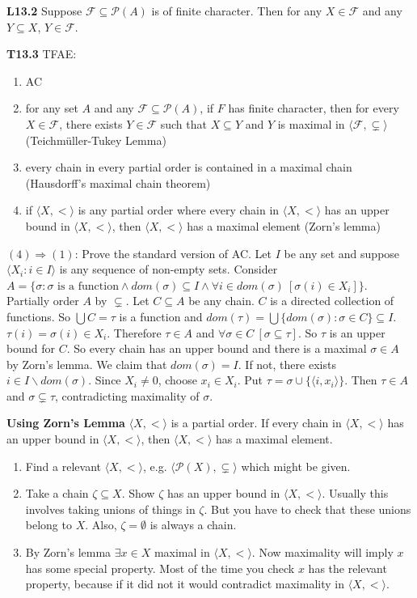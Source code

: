 \documentclass[10pt, landscape]{article}
\begin{document}
\begin{multicols*}{3}
\textbf{L13.2} Suppose $\mathcal{F}\subseteq\mathcal{P}(A)$ is of finite character. Then for any $X\in\mathcal{F}$ and any $Y\subseteq X$, $Y\in\mathcal{F}$.

\textbf{T13.3} TFAE:
\begin{enumerate}
    \item AC
    \item for any set $A$ and any $\mathcal{F}\subseteq\mathcal{P}(A)$, if $F$ has finite character, then for every $X \in \mathcal{F}$, there exists $Y\in\mathcal{F}$ such that $X\subseteq Y$ and $Y$ is maximal in $\langle\mathcal{F},\subsetneq\rangle$ (Teichmüller-Tukey Lemma)
    \item every chain in every partial order is contained in a maximal chain (Hausdorff's maximal chain theorem)
    \item if $\langle X, < \rangle$ is any partial order where every chain in $\langle X, < \rangle$ has an upper bound in $\langle X, <\rangle$, then $\langle X, <\rangle$ has a maximal element (Zorn's lemma)
\end{enumerate}
$(4) \Longrightarrow (1)$: Prove the standard version of AC. Let $I$ be any set and suppose $\langle X_i:i \in I\rangle$ is any sequence of non-empty sets. Consider $A=\{\sigma:\sigma \text{ is a function}\land dom(\sigma)\subseteq I \land \forall i \in dom(\sigma)\ [\sigma(i)\in X_i]\}$. Partially order $A$ by $\subsetneq$. Let $C\subseteq  A$ be any chain. $C$ is a directed collection of functions. So $\bigcup C=\tau$ is a function and $dom(\tau)=\bigcup\{dom(\sigma):\sigma\in C\}\subseteq I$. $\tau(i)=\sigma(i)\in X_i$. Therefore $\tau\in A$ and $\forall \sigma \in C\ [\sigma\subseteq \tau]$. So $\tau$ is an upper bound for $C$. So every chain has an upper bound and there is a maximal $\sigma\in A$ by Zorn's lemma. We claim that $dom(\sigma)=I$. If not, there exists $i\in I \backslash dom(\sigma)$. Since $X_i\neq0$, choose $x_i\in X_i$. Put $\tau=\sigma\cup\{\langle i, x_i\rangle\}$. Then $\tau \in A$ and $\sigma \subsetneq \tau$, contradicting maximality of $\sigma$.

\textbf{Using Zorn's Lemma} $\langle X, < \rangle$ is a partial order. If every chain in $\langle X, < \rangle$ has an upper bound in $\langle X, < \rangle$, then $\langle X, < \rangle$ has a maximal element.
\begin{enumerate}
    \item Find a relevant $\langle X, < \rangle$, e.g. $\langle \mathcal{P}(X), \subsetneq \rangle$ which might be given.
    \item Take a chain $\zeta \subseteq X$. Show $\zeta$ has an upper bound in $\langle X, < \rangle$. Usually this involves taking unions of things in $\zeta$. But you have to check that these unions belong to $X$. Also, $\zeta=\emptyset$ is always a chain.
    \item By Zorn's lemma $\exists x \in X$ maximal in $\langle X, < \rangle$. Now maximality will imply $x$ has some special property. Most of the time you check $x$ has the relevant property, because if it did not it would contradict maximality in $\langle X, < \rangle$.
\end{enumerate}


\end{multicols*}
\end{document}
